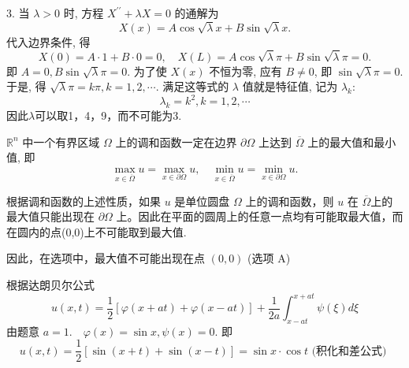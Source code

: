 \begin{questions}
\begin{solution}
3. 当 $ \lambda>0 $ 时, 方程 $ X^{\prime \prime}+\lambda X=0 $ 的通解为
$$
X(x)=A \cos \sqrt{\lambda} x+B \sin \sqrt{\lambda} x .
$$
代入边界条件, 得
$$
X(0)=A \cdot 1+B \cdot 0=0, \quad X(L)=A \cos \sqrt{\lambda} \pi+B \sin \sqrt{\lambda} \pi=0 .
$$
即 $ A=0, B \sin \sqrt{\lambda} \pi=0 $. 为了使 $ X(x) $ 不恒为零, 应有 $ B \neq 0 $, 即 $ \sin \sqrt{\lambda} \pi=0 $. 于是, 得 $ \sqrt{\lambda} \pi=k \pi, k=1,2, \cdots $. 满足这等式的 $ \lambda $ 值就是特征值, 记为 $ \lambda_{k}: $
$$
\lambda_{k}=k^{2} , k=1,2, \cdots
$$
因此$\lambda$可以取1，4，9，而不可能为3.
\end{solution}
\begin{solution}
    $ \mathbb{R}^{n} $ 中一个有界区域 $ \Omega $ 上的调和函数一定在边界 $ \partial \Omega $ 上达到 $ \overline{\Omega} $ 上的最大值和最小值, 即
$$
\max _{x \in \overline{\Omega}} u=\max _{x \in \partial \Omega} u, \quad \min _{x \in \overline{\Omega}} u=\min _{x \in \partial \Omega} u .
$$

根据调和函数的上述性质，如果 $u$ 是单位圆盘 $\Omega$ 上的调和函数，则 $u$ 在 $\overline{\Omega}$上的最大值只能出现在 $\partial \Omega$ 上。因此在平面的圆周上的任意一点均有可能取最大值，而在圆内的点(0,0)上不可能取到最大值.

因此，在选项中，最大值不可能出现在点 $(0,0)$ (选项 A)
\end{solution}

\begin{solution}
    根据达朗贝尔公式
$$
u(x, t)=\frac{1}{2}[\varphi(x+a t)+\varphi(x-a t)]+\frac{1}{2 a} \int_{x-a t}^{x+a t} \psi(\xi) d \xi
$$
由题意 $ a=1 . \quad \varphi(x)=\sin x , \psi(x)=0$.
即
$$u(x, t)=\frac{1}{2}[\sin (x+t)+\sin (x-t)]=\sin x\cdot\cos t \text { (积化和差公式) }$$
\end{solution}
\end{questions}

